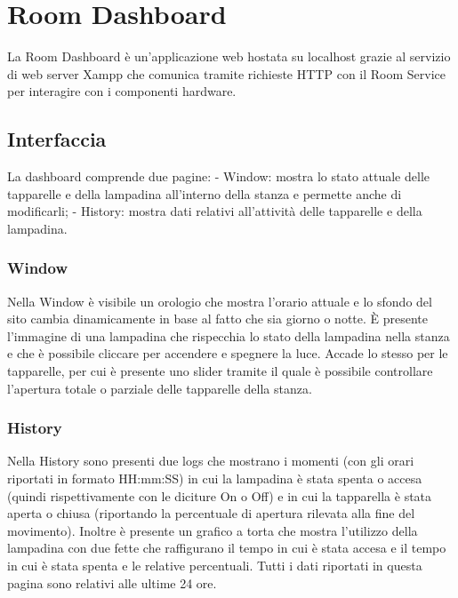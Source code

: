 \documentclass[12pt]{article}
\begin{document}
\section{Room Dashboard}

La Room Dashboard è un'applicazione web hostata su localhost grazie al servizio di web server Xampp che comunica tramite richieste HTTP con il Room Service per interagire con i componenti hardware.

\subsection{Interfaccia}

La dashboard comprende due pagine:
\newline
- Window: mostra lo stato attuale delle tapparelle e della lampadina all'interno della stanza e permette anche di modificarli;
\newline
- History: mostra dati relativi all'attività delle tapparelle e della lampadina.

\subsubsection{Window}
Nella Window è visibile un orologio che mostra l'orario attuale e lo sfondo del sito cambia dinamicamente in base al fatto che sia giorno o notte. È presente l'immagine di una lampadina che rispecchia lo stato della lampadina nella stanza e che è possibile cliccare per accendere e spegnere la luce. Accade lo stesso per le tapparelle, per cui è presente uno slider tramite il quale è possibile controllare l'apertura totale o parziale delle tapparelle della stanza.

\subsubsection{History}
Nella History sono presenti due logs che mostrano i momenti (con gli orari riportati in formato HH:mm:SS) in cui la lampadina è stata spenta o accesa (quindi rispettivamente con le diciture On o Off) e in cui la tapparella è stata aperta o chiusa (riportando la percentuale di apertura rilevata alla fine del movimento).\newline
Inoltre è presente un grafico a torta che mostra l'utilizzo della lampadina con due fette che raffigurano il tempo in cui è stata accesa e il tempo in cui è stata spenta e le relative percentuali.\newline
Tutti i dati riportati in questa pagina sono relativi alle ultime 24 ore.
\end{document}
